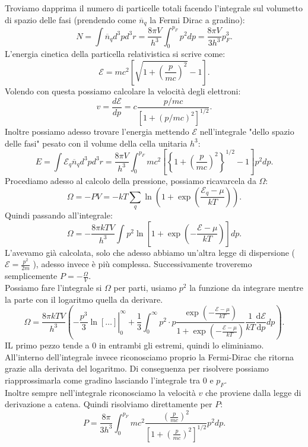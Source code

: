 Troviamo dapprima il numero di particelle totali facendo l'integrale sul volumetto di spazio delle fasi (prendendo come $\overline{n}_{q}$ la Fermi Dirac a gradino):
\[
	N = \int \overline{n}_{q}d^3p d^3r= \frac{8\pi V}{h^3}\int_{0}^{p_{F}} p^2dp = \frac{8\pi V}{3h^3}p_{F}^3 
.\] 
L'energia cinetica della particella relativistica si scrive come:
\[
	\mathcal{E} = mc^2\left[ \sqrt{1 + \left( \frac{p}{mc} \right)^2} - 1 \right] 
.\] 
Volendo con questa possiamo calcolare la velocità degli elettroni:
\[
	v = \frac{d\mathcal{E} }{dp} = c \frac{p / mc }{\left[ 1 + \left( p /mc  \right)^2 \right] ^{1 /2}}
.\] 
Inoltre possiamo adesso trovare l'energia mettendo $\mathcal{E} $ nell'integrale "dello spazio delle fasi" pesato con il volume della cella unitaria $h^3$:
\[
	E = \int\mathcal{E} _{q} \overline{n}_{q}d^3p d^3r = \frac{8\pi V}{h^3}\int_{0}^{p_{F}} mc^2\left[ \left\{ 1 + \left( \frac{p}{mc} \right)^{2} \right\}^{1 /2} -1 \right] p^2dp 
.\] 
Procediamo adesso al calcolo della pressione, possiamo ricavarcela da $\Omega $:
\[
	\Omega = - PV = - kT \sum_{q}^{} \ln\left( 1+\exp\left( \frac{\mathcal{E} _{q}-\mu }{kT} \right)  \right) 
.\] 
Quindi passando all'integrale:
\[
	\Omega = - \frac{8\pi kTV}{h^3}\int_{}^{} p^2\ln\left[ 1 + \exp\left( - \frac{\mathcal{E} - \mu }{kT} \right)  \right] dp 
.\] 
L'avevamo già calcolata, solo che adesso abbiamo un'altra legge di dispersione ($\mathcal{E} = \frac{p^2}{2m}$ ), adesso invece è più complessa. Successivamente troveremo semplicemente $P = - \frac{\Omega }{V}$.\\
Possiamo fare l'integrale si $\Omega $ per parti, usiamo $p^2$ la funzione da integrare mentre la parte con il logaritmo quella da derivare.
\[
	\Omega = \frac{8\pi kTV}{h^3}\left( - \left.\frac{p^3}{3}\ln\left[ \ldots \right] \right|_{0}^{\infty} + \frac{1}{3}\int_{0}^{\infty} p^2\cdot p \frac{\exp\left( -\frac{\mathcal{E} -\mu }{kT} \right) }{1 + \exp\left( -\frac{\mathcal{E} -\mu }{kT} \right) } \frac{1}{kT} \frac{\mbox{d} \mathcal{E} }{\mbox{d} p}  dp
 \right) 
 .\] 
IL primo pezzo tende a $0$ in entrambi gli estremi, quindi lo eliminiamo. All'interno dell'integrale invece riconosciamo proprio la Fermi-Dirac che ritorna grazie alla derivata del logaritmo. Di conseguenza per risolvere possiamo riapprossimarla come gradino lasciando l'integrale tra $0$ e $p_{F}$. \\
Inoltre sempre nell'integrale riconosciamo la velocità $v$ che proviene dalla legge di derivazione a catena. Quindi risolviamo direttamente per $P$:
\[
	P = \frac{8\pi}{3h^3}\int_{0}^{p_{F}} mc^2 \frac{\left( \frac{p}{mc} \right) ^2}{\left[ 1+ \left( \frac{p}{mc} \right) ^2 \right] ^{1 /2}} p^2 dp
.\]
